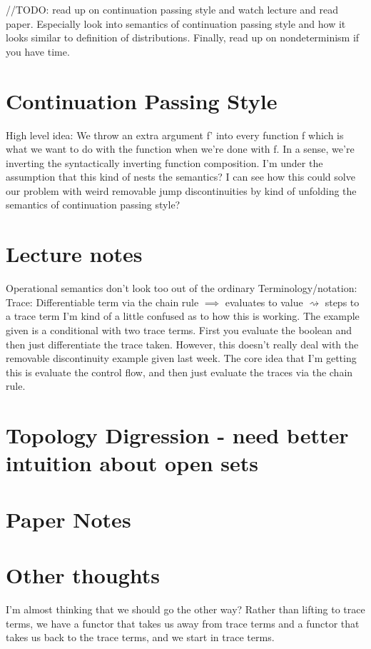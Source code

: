 \documentclass{article}
\begin{document}
    //TODO: read up on continuation passing style and watch lecture and read paper. Especially look into semantics of continuation passing style and how it looks similar to definition of distributions. Finally, read up on nondeterminism if you have time. 
    
    \section{Continuation Passing Style}
    High level idea: We throw an extra argument f' into every function f which is what we want to do with the function when we're done with f. In a sense, we're inverting the syntactically inverting function composition. I'm under the assumption that this kind of nests the semantics? I can see how this could solve our problem with weird removable jump discontinuities by kind of unfolding the semantics of continuation passing style?
    
    \section{Lecture notes}
    Operational semantics don't look too out of the ordinary
    Terminology/notation:
    Trace: Differentiable term via the chain rule
    \newline
    $\implies$ evaluates to value
    \newline
    $\rightsquigarrow$ steps to a trace term
    \newline
    I'm kind of a little confused as to how this is working. The example given is a conditional with two trace terms. First you evaluate the boolean and then just differentiate the trace taken. However, this doesn't really deal with the removable discontinuity example given last week.
    \newline
    The core idea that I'm getting this is evaluate the control flow, and then just evaluate the traces via the chain rule. 
    \newline
    \section{Topology Digression - need better intuition about open sets}
    
    \section{Paper Notes}
    
    \section{Other thoughts}
    I'm almost thinking that we should go the other way? Rather than lifting to trace terms, we have a functor that takes us away from trace terms and a functor that takes us back to the trace terms, and we start in trace terms. 
\end{document}
